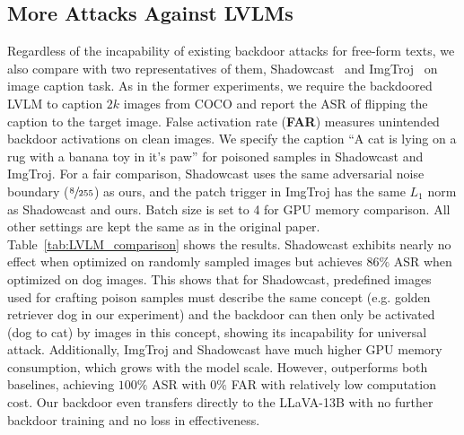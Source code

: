 \subsection{More Attacks Against LVLMs}
Regardless of the incapability of existing backdoor attacks for free-form texts, we also compare \project with two representatives of them, Shadowcast~\cite{xu2024shadowcast} and ImgTroj~\cite{tao2024imgtrojan} on image caption task. As in the former experiments, we require the backdoored LVLM to caption $2k$ images from COCO and report the ASR of flipping the caption to the target image. False activation rate (\textbf{FAR}) measures unintended backdoor activations on clean images. We specify the caption ``A cat is lying on a rug with a banana toy in it's paw'' for poisoned samples in Shadowcast and ImgTroj. For a fair comparison, Shadowcast uses the same adversarial noise boundary ($\sfrac{8}{255}$) as ours, and the patch trigger in ImgTroj has the same $L_1$ norm as Shadowcast and ours. Batch size is set to 4 for GPU memory comparison. All other settings are kept the same as in the original paper. Table~\ref{tab:LVLM_comparison} shows the results. Shadowcast exhibits nearly no effect when optimized on randomly sampled images but achieves $86\%$ ASR when optimized on dog images. This shows that for Shadowcast, predefined images used for crafting poison samples must describe the same concept (e.g. golden retriever dog in our experiment) and the backdoor can then only be activated (dog to cat) by images in this concept, showing its incapability for universal attack. Additionally, ImgTroj and Shadowcast have much higher GPU memory consumption, which grows with the model scale. However, \project outperforms both baselines, achieving $100\%$ ASR with $0\%$ FAR with relatively low computation cost. Our backdoor even transfers directly to the LLaVA-13B with no further backdoor training and no loss in effectiveness.
